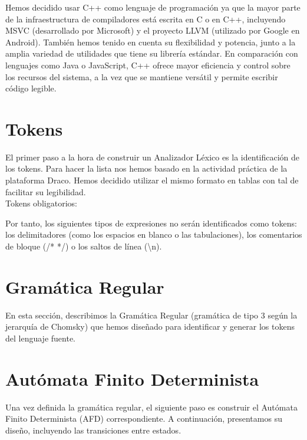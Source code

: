 \documentclass{article}
\begin{document}
Hemos decidido usar C++ como lenguaje de programación ya que la mayor parte de la infraestructura de compiladores está escrita en C o en C++, incluyendo MSVC (desarrollado por Microsoft) y el proyecto LLVM (utilizado por Google en Android). También hemos tenido en cuenta su flexibilidad y potencia, junto a la amplia variedad de utilidades que tiene su librería estándar. En comparación con lenguajes como Java o JavaScript, C++ ofrece mayor eficiencia y control sobre los recursos del sistema, a la vez que se mantiene versátil y permite escribir código legible.

\newpage

\section{Tokens}
El primer paso a la hora de construir un Analizador Léxico es la identificación de los tokens. Para hacer la lista nos hemos basado en la actividad práctica de la plataforma Draco. Hemos decidido utilizar el mismo formato en tablas con tal de facilitar su legibilidad.\\
Tokens obligatorios:



Por tanto, los siguientes tipos de expresiones no serán identificados como tokens: los delimitadores (como los espacios en blanco o las tabulaciones), los comentarios de bloque (/* */) o los saltos de línea (\textbackslash n).

\section{Gramática Regular}

En esta sección, describimos la Gramática Regular (gramática de tipo 3 según la jerarquía de Chomsky) que hemos diseñado para identificar y generar los tokens del lenguaje fuente. 

\vspace{0.1cm}


\section{Autómata Finito Determinista}
Una vez definida la gramática regular, el siguiente paso es construir el Autómata Finito Determinista (AFD) correspondiente. A continuación, presentamos su diseño, incluyendo las transiciones entre estados.

\vspace{0.1cm}

\end{document}
